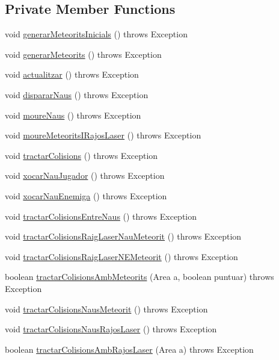 \subsection*{Private Member Functions}
\begin{DoxyCompactItemize}
\item 
void \hyperlink{class_joc_ab4169a454c9b3b6b6030fd785483a15d}{generar\+Meteorits\+Inicials} ()  throws Exception 
\item 
void \hyperlink{class_joc_afb711913c78395c05839c3f775792beb}{generar\+Meteorits} ()  throws Exception 
\item 
void \hyperlink{class_joc_aafe85787281ae19be9ee44aabc5c116c}{actualitzar} ()  throws Exception 
\item 
void \hyperlink{class_joc_a82b3c98f504183b2ade08ae6f7fbbdce}{disparar\+Naus} ()  throws Exception 
\item 
void \hyperlink{class_joc_a9b0d8fa2d2613d958dc8bf650ae78a34}{moure\+Naus} ()  throws Exception 
\item 
void \hyperlink{class_joc_af9e0ddcc5b82db8ff4d07bbd443c7f8d}{moure\+Meteorits\+I\+Rajos\+Laser} ()  throws Exception 
\item 
void \hyperlink{class_joc_a1be330c10f1e2ee06f696e0a0bdec7c7}{tractar\+Colisions} ()  throws Exception 
\item 
void \hyperlink{class_joc_a471c58ad94b7a8732a6b3e4695f2a691}{xocar\+Nau\+Jugador} ()  throws Exception 
\item 
void \hyperlink{class_joc_a84da80994a7dd370b3772cf962500617}{xocar\+Nau\+Enemiga} ()  throws Exception 
\item 
void \hyperlink{class_joc_abc5db47ede50ddeccb50b2872d05cb6c}{tractar\+Colisions\+Entre\+Naus} ()  throws Exception 
\item 
void \hyperlink{class_joc_a9a3116242cc69985726f4825be70a9b5}{tractar\+Colisions\+Raig\+Laser\+Nau\+Meteorit} ()  throws Exception 
\item 
void \hyperlink{class_joc_af717aa44d1134343a67fc08374c3af45}{tractar\+Colisions\+Raig\+Laser\+N\+E\+Meteorit} ()  throws Exception 
\item 
boolean \hyperlink{class_joc_a16b0be1ee6298106946df8150044f667}{tractar\+Colisions\+Amb\+Meteorits} (Area a, boolean puntuar)  throws Exception 
\item 
void \hyperlink{class_joc_acf31c665e8f734f15f40f8e6792e8bba}{tractar\+Colisions\+Naus\+Meteorit} ()  throws Exception 
\item 
void \hyperlink{class_joc_a9ccc5adec1e7efdd6c01ba393d3686c6}{tractar\+Colisions\+Naus\+Rajos\+Laser} ()  throws Exception 
\item 
boolean \hyperlink{class_joc_ac94f4a327797f506171f0db74b3feaee}{tractar\+Colisions\+Amb\+Rajos\+Laser} (Area a)  throws Exception 
\end{DoxyCompactItemize}


